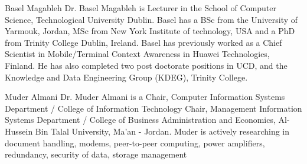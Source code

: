 
\begin{IEEEbiography}{Basel Magableh} 
Dr. Basel Magableh is  Lecturer in the School of Computer Science, Technological University Dublin. Basel has a BSc from the University of Yarmouk, Jordan, MSc from New York Institute of technology, USA and a PhD from Trinity College Dublin, Ireland. Basel has previously worked as a Chief Scientist in Mobile/Terminal Context Awareness in Huawei Technologies, Finland. He has also completed two post doctorate positions in UCD, and the Knowledge and Data Engineering Group (KDEG), Trinity College.
\end{IEEEbiography}

\begin{IEEEbiography}{Muder Almani} 
Dr. Muder Almani is a Chair, Computer Information Systems Department / College of Information Technology Chair, Management Information Systems Department / College of Business Administration and Economics, Al-Hussein Bin Talal University, Ma'an - Jordan. Muder is actively researching in document handling, modems, peer-to-peer computing, power amplifiers, redundancy, security of data, storage management
\end{IEEEbiography}

